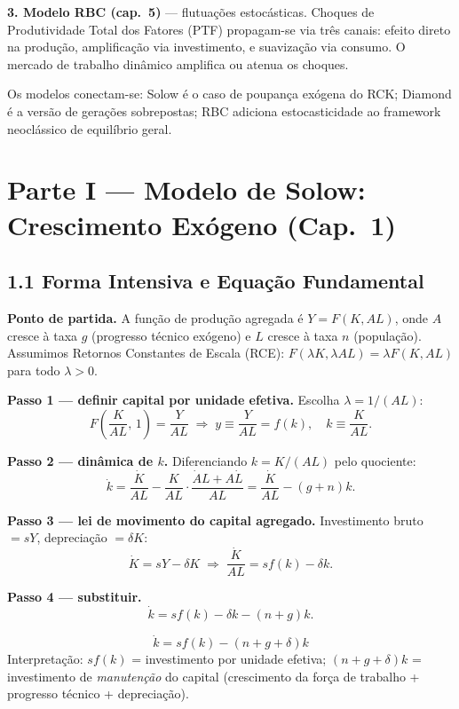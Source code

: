 \documentclass[12pt, a4paper]{article}
\begin{document}
\textbf{3. Modelo RBC (cap.\ 5)} --- flutuações estocásticas. Choques de Produtividade Total dos Fatores (PTF) propagam-se via três canais: efeito direto na produção, amplificação via investimento, e suavização via consumo. O mercado de trabalho dinâmico amplifica ou atenua os choques.

Os modelos conectam-se: Solow é o caso de poupança exógena do RCK; Diamond é a versão de gerações sobrepostas; RBC adiciona estocasticidade ao framework neoclássico de equilíbrio geral.

\section*{Parte I --- Modelo de Solow: Crescimento Exógeno (Cap.\ 1)}

\subsection*{1.1 Forma Intensiva e Equação Fundamental}

\textbf{Ponto de partida.} A função de produção agregada é $Y = F(K, AL)$, onde $A$ cresce à taxa $g$ (progresso técnico exógeno) e $L$ cresce à taxa $n$ (população). Assumimos Retornos Constantes de Escala (RCE): $F(\lambda K, \lambda AL) = \lambda F(K, AL)$ para todo $\lambda > 0$.

\textbf{Passo 1 --- definir capital por unidade efetiva.} Escolha $\lambda = 1/(AL)$:
\[
F\!\left(\frac{K}{AL},\, 1\right) = \frac{Y}{AL} \;\Longrightarrow\; y \equiv \frac{Y}{AL} = f(k), \quad k \equiv \frac{K}{AL}.
\]

\textbf{Passo 2 --- dinâmica de $k$.} Diferenciando $k = K/(AL)$ pelo quociente:
\[
\dot{k} = \frac{\dot{K}}{AL} - \frac{K}{AL}\cdot\frac{\dot{A}L + A\dot{L}}{AL} = \frac{\dot{K}}{AL} - (g+n)k.
\]

\textbf{Passo 3 --- lei de movimento do capital agregado.} Investimento bruto $= sY$, depreciação $= \delta K$:
\[
\dot{K} = sY - \delta K \;\Longrightarrow\; \frac{\dot{K}}{AL} = sf(k) - \delta k.
\]

\textbf{Passo 4 --- substituir.}
\[
\dot{k} = sf(k) - \delta k - (n+g)k.
\]

\begin{formulabox}[title={Equação Fundamental de Solow}]
\[
\boxed{\dot{k} = sf(k) - (n+g+\delta)k}
\]
Interpretação: $sf(k)$ = investimento por unidade efetiva; $(n+g+\delta)k$ = investimento de \emph{manutenção} do capital (crescimento da força de trabalho + progresso técnico + depreciação).
\end{formulabox}
\end{document}
